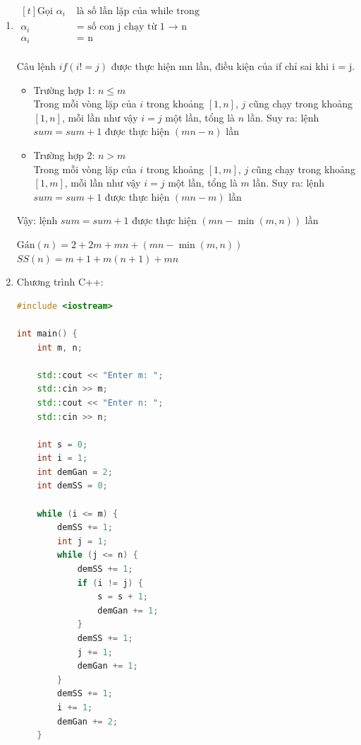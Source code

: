 \documentclass[12pt, letterpaper]{article}
\begin{document}
\begin{enumerate}
	\item $ \begin{aligned}[t]
			      \text{Gọi } \alpha_i & \text{ là số lần lặp của while trong}            \\
			                  \alpha_i & \text{ = số con j chạy từ 1 $\rightarrow$ n}      \\
			                  \alpha_i & \text{ = n} \\
		      \end{aligned} $

	      Câu lệnh $ if(i != j) $ được thực hiện mn lần, điều kiện của if chỉ sai khi i = j.

	      \begin{itemize}
		      \item Trường hợp 1: $n \leq m$ \\
		            Trong mỗi vòng lặp của $ i $ trong khoảng $ [1, n] $, $ j $ cũng chạy trong khoảng $ [1, n] $, mỗi lần như vậy $ i = j $ một lần, tổng là $ n $ lần.
		            Suy ra: lệnh $ sum = sum + 1 $ được thực hiện $ (mn - n) $ lần

		      \item Trường hợp 2: $n > m$ \\
		            Trong mỗi vòng lặp của $ i $ trong khoảng $ [1, m] $, $ j $ cũng chạy trong khoảng $ [1, m] $, mỗi lần như vậy $ i = j $ một lần, tổng là $ m $ lần.
		            Suy ra: lệnh $ sum = sum + 1 $ được thực hiện $ (mn - m) $ lần
	      \end{itemize}

          Vậy: lệnh $ sum = sum + 1 $ được thực hiện $ (mn - \min(m,n)) $ lần

          $ \text{Gán}(n) = 2 + 2m + mn + (mn - \min(m,n)) $ \\
	      $ SS(n) = m + 1 + m(n+1) + mn $
    \item Chương trình C++:
\begin{lstlisting}[language=C++]
#include <iostream>

int main() {
    int m, n;
    
    std::cout << "Enter m: ";
    std::cin >> m;
    std::cout << "Enter n: ";
    std::cin >> n;
    
    int s = 0;
    int i = 1;
    int demGan = 2;
    int demSS = 0;
    
    while (i <= m) {
        demSS += 1;
        int j = 1;
        while (j <= n) {
            demSS += 1;
            if (i != j) {
                s = s + 1;
                demGan += 1;
            }
            demSS += 1;
            j += 1;
            demGan += 1;
        }
        demSS += 1;
        i += 1;
        demGan += 2;
    }
    

\end{lstlisting}
\end{enumerate}
\end{document}
